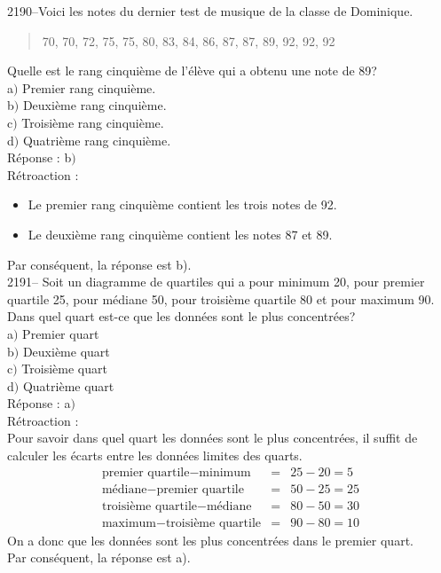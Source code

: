 \documentclass[letterpaper, 12pt]{article}
\begin{document}

2190--Voici les notes du dernier test de musique de la classe de Dominique.
\begin{quote}
 70, 70, 72, 75, 75, 80, 83, 84, 86, 87, 87, 89, 92, 92, 92
\end{quote}
Quelle est le rang cinqui\`eme de l'\'el\`eve qui a obtenu une note de 89? \\

a$)$ Premier rang cinqui\`eme.\\
b$)$ Deuxi\`eme rang cinqui\`eme. \\
c$)$ Troisi\`eme rang cinqui\`eme.\\
d$)$ Quatri\`eme rang cinqui\`eme.\\

R\'eponse : b$)$\\

R\'etroaction :\\
\begin{itemize}
 \item Le premier rang cinqui\`eme contient les trois notes de 92.
\item Le deuxi\`eme rang cinqui\`eme contient les notes 87 et 89.\\
\end{itemize}
Par cons\'equent, la r\'eponse est b).\\

2191-- Soit un diagramme de quartiles qui a pour minimum 20, pour premier quartile 25, pour m\'ediane 50, pour troisi\`eme quartile 80 et pour maximum 90. Dans quel quart est-ce que les donn\'ees sont le plus concentr\'ees?\\

a$)$ Premier quart\\
b$)$ Deuxi\`eme quart\\
c$)$ Troisi\`eme quart\\
d$)$ Quatri\`eme quart\\

R\'eponse : a$)$\\

R\'etroaction :\\
Pour savoir dans quel quart les donn\'ees sont le plus concentr\'ees, il suffit de calculer les \'ecarts entre les donn\'ees limites des quarts.
\begin{eqnarray*}
 \textrm{premier quartile}-\textrm{minimum}&=&25-20=5\\
\textrm{m\'ediane}-\textrm{premier quartile}&=&50-25=25\\
\textrm{troisi\`eme quartile}-\textrm{m\'ediane}&=&80-50=30\\
\textrm{maximum}-\textrm{troisi\`eme quartile}&=&90-80=10
\end{eqnarray*}
On a donc que les donn\'ees sont les plus concentr\'ees dans le premier quart.\\
Par cons\'equent, la r\'eponse est a).\\
\end{document}

